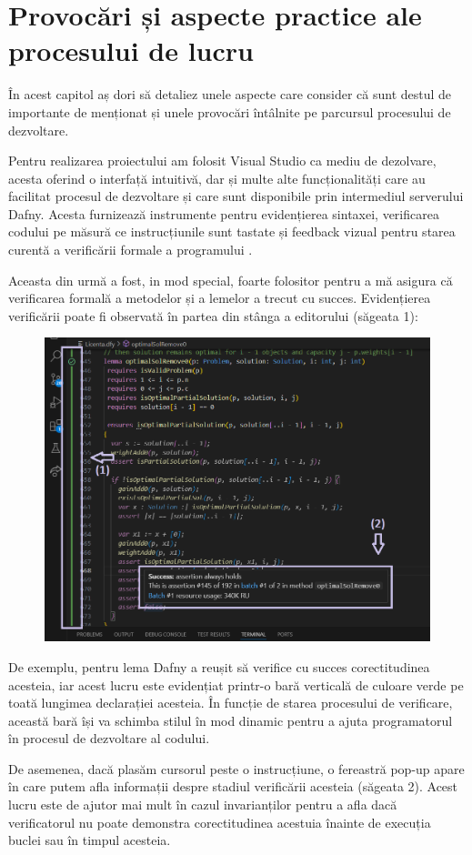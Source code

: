 \chapter{Provocări și aspecte practice ale procesului de lucru}
\begin{sloppypar}

În acest capitol aș dori să detaliez unele aspecte care consider că sunt destul de importante de menționat și unele provocări întâlnite pe parcursul procesului de dezvoltare. \par
Pentru realizarea proiectului am folosit Visual Studio ca mediu de dezolvare, acesta oferind o interfață intuitivă, dar și multe alte funcționalități care au facilitat procesul de dezvoltare și care sunt disponibile prin intermediul serverului Dafny. Acesta furnizează instrumente pentru evidențierea sintaxei, verificarea codului pe măsură ce instrucțiunile sunt tastate și feedback vizual pentru starea curentă a verificării formale a programului \cite{leino2021dafny}. \par
Aceasta din urmă a fost, in mod special, foarte folositor pentru a mă asigura că verificarea formală a metodelor și a lemelor a trecut cu succes. Evidențierea verificării poate fi observată în partea din stânga a editorului (săgeata 1):
\begin{figure}[!ht]
    \centering
    \includegraphics[width=0.6\linewidth]{images/imageVerificationSucceeded.png}
\end{figure}
 \par De exemplu, pentru lema  Dafny a reușit să verifice cu succes corectitudinea acesteia, iar acest lucru este evidențiat printr-o bară verticală de culoare verde pe toată lungimea declarației acesteia. În funcție de starea procesului de verificare, această bară își va schimba stilul în mod dinamic pentru a ajuta programatorul în procesul de dezvoltare al codului.
 \par De asemenea, dacă plasăm cursorul peste o instrucțiune, o fereastră pop-up apare în care putem afla informații despre stadiul verificării acesteia (săgeata 2). Acest lucru este de ajutor mai mult în cazul invarianților pentru a afla dacă verificatorul nu poate demonstra corectitudinea acestuia înainte de execuția buclei sau în timpul acesteia. \\ \par

\end{sloppypar}
